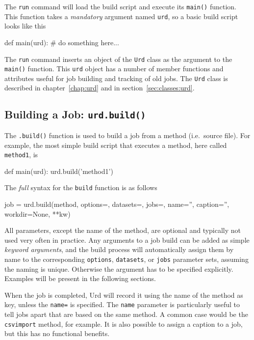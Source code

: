 The \texttt{run} command will load the build script and execute
its \texttt{main()} function.  This function takes
a \textsl{mandatory} argument named \texttt{urd}, so a basic build
script looks like this
\begin{python}
def main(urd):
    # do something here...
\end{python}
The \texttt{run} command inserts an object of the \texttt{Urd} class
as the argument to the \texttt{main()} function.  This \texttt{urd}
object has a number of member functions and attributes useful for job
building and tracking of old jobs.  The \texttt{Urd} class is
described in chapter~\ref{chap:urd} and in
section~\ref{sec:classes:urd}.



\subsection{Building a Job: \texttt{urd.build()}}
The \texttt{.build()} function is used to build a job from a method
(i.e.\ source file).  For example, the most simple build script that
executes a method, here called \texttt{method1}, is
\begin{python}
def main(urd):
    urd.build('method1')
\end{python}
The \textsl{full} syntax for the \texttt{build} function is as follows
\begin{python}
job = urd.build(method,
                options={}, datasets={}, jobs={},
                name='', caption='', workdir=None, **kw)
\end{python}
All parameters, except the name of the method, are optional and
typically not used very often in practice.  Any arguments to a job
build can be added as simple \textsl{keyword arguments}, and the build
process will automatically assign them by name to the corresponding
\texttt{options}, \texttt{datasets}, or \texttt{jobs} parameter
sets, assuming the naming is unique.  Otherwise the argument has to be
specified explicitly.  Examples will be present in the following
sections.

When the job is completed, Urd will record it using the name of the
method as key, unless the \texttt{name=} is specified.
The \texttt{name} parameter is particularly useful to tell jobs apart
that are based on the same method.  A common case would be
the \texttt{csvimport} method, for example.  It is also possible to
assign a caption to a job, but this has no functional benefits.

